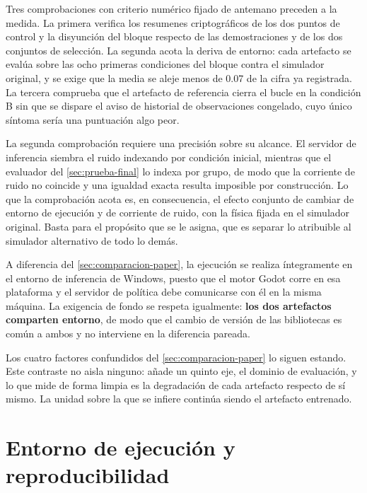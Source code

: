 
Tres comprobaciones con criterio num\'erico fijado de antemano preceden a la medida. La
primera verifica los resumenes criptogr\'aficos de los dos puntos de control y la disyunci\'on
del bloque respecto de las demostraciones y de los dos conjuntos de selecci\'on. La segunda
acota la deriva de entorno: cada artefacto se eval\'ua sobre las ocho primeras condiciones
del bloque contra el simulador original, y se exige que la media se aleje menos de \num{0.07}
de la cifra ya registrada. La tercera comprueba que el artefacto de referencia cierra el
bucle en la condici\'on B sin que se dispare el aviso de historial de observaciones
congelado, cuyo \'unico s\'intoma ser\'ia una puntuaci\'on algo peor.

La segunda comprobaci\'on requiere una precisi\'on sobre su alcance. El servidor de
inferencia siembra el ruido indexando por condici\'on inicial, mientras que el evaluador del
\cref{sec:prueba-final} lo indexa por grupo, de modo que la corriente de ruido no coincide y
una igualdad exacta resulta imposible por construcci\'on. Lo que la comprobaci\'on acota es,
en consecuencia, el efecto conjunto de cambiar de entorno de ejecuci\'on y de corriente de
ruido, con la f\'isica fijada en el simulador original. Basta para el prop\'osito que se le
asigna, que es separar lo atribuible al simulador alternativo de todo lo dem\'as.

A diferencia del \cref{sec:comparacion-paper}, la ejecuci\'on se realiza \'integramente en
el entorno de inferencia de Windows, puesto que el motor Godot corre en esa plataforma y el
servidor de pol\'itica debe comunicarse con \'el en la misma m\'aquina. La exigencia de fondo
se respeta igualmente: \textbf{los dos artefactos comparten entorno}, de modo que el cambio
de versi\'on de las bibliotecas es com\'un a ambos y no interviene en la diferencia pareada.


Los cuatro factores confundidos del \cref{sec:comparacion-paper} lo siguen estando. Este
contraste no aisla ninguno: a\~nade un quinto eje, el dominio de evaluaci\'on, y lo que mide
de forma limpia es la degradaci\'on de cada artefacto respecto de s\'i mismo. La unidad sobre
la que se infiere contin\'ua siendo el artefacto entrenado.

\section{Entorno de ejecuci\'on y reproducibilidad}
\label{sec:entorno}

